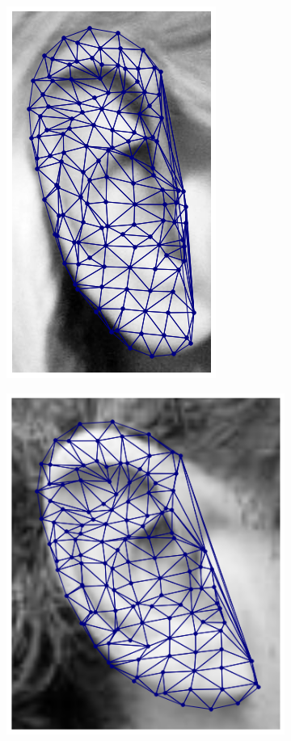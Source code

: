 \begin{figure}[h!]
\begin{subfigure}[b]{0.115\textwidth}
    \end{subfigure}
    \begin{subfigure}[b]{0.115\textwidth}
            \includegraphics[height=1\textwidth]{supports/Fittings/fitting_ear_0010}
    \end{subfigure}
    \begin{subfigure}[b]{0.115\textwidth}
            \includegraphics[height=1\textwidth]{supports/Fittings/fitting_ear_0015}

\end{subfigure}
\end{figure}
